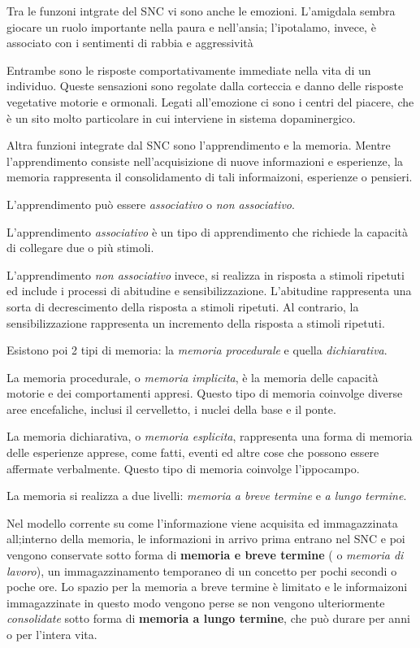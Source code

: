 \documentclass[]{article}
\begin{document}
Tra le funzoni intgrate del SNC vi sono anche le emozioni. L'amigdala
sembra giocare un ruolo importante nella paura e nell'ansia;
l'ipotalamo, invece, è associato con i sentimenti di rabbia e
aggressività

Entrambe sono le risposte comportativamente immediate nella vita di un
individuo. Queste sensazioni sono regolate dalla corteccia e danno delle
risposte vegetative motorie e ormonali. Legati all'emozione ci sono i
centri del piacere, che è un sito molto particolare in cui interviene in
sistema dopaminergico.

Altra funzioni integrate dal SNC sono l'apprendimento e la memoria.
Mentre l'apprendimento consiste nell'acquisizione di nuove informazioni
e esperienze, la memoria rappresenta il consolidamento di tali
informaizoni, esperienze o pensieri.

L'apprendimento può essere \emph{associativo} o \emph{non associativo}.

L'apprendimento \emph{associativo} è un tipo di apprendimento che
richiede la capacità di collegare due o più stimoli.

L'apprendimento \emph{non associativo} invece, si realizza in risposta a
stimoli ripetuti ed include i processi di abitudine e sensibilizzazione.
L'abitudine rappresenta una sorta di decrescimento della risposta a
stimoli ripetuti. Al contrario, la sensibilizzazione rappresenta un
incremento della risposta a stimoli ripetuti.

Esistono poi 2 tipi di memoria: la \emph{memoria procedurale} e quella
\emph{dichiarativa}.

La memoria procedurale, o \emph{memoria implicita}, è la memoria delle
capacità motorie e dei comportamenti appresi. Questo tipo di memoria
coinvolge diverse aree encefaliche, inclusi il cervelletto, i nuclei
della base e il ponte.

La memoria dichiarativa, o \emph{memoria esplicita}, rappresenta una
forma di memoria delle esperienze apprese, come fatti, eventi ed altre
cose che possono essere affermate verbalmente. Questo tipo di memoria
coinvolge l'ippocampo.

La memoria si realizza a due livelli: \emph{memoria a breve termine} e
\emph{a lungo termine}.

Nel modello corrente su come l'informazione viene acquisita ed
immagazzinata all;interno della memoria, le informazioni in arrivo prima
entrano nel SNC e poi vengono conservate sotto forma di \textbf{memoria
e breve termine} ( o \emph{memoria di lavoro}), un immagazzinamento
temporaneo di un concetto per pochi secondi o poche ore. Lo spazio per
la memoria a breve termine è limitato e le informaizoni immagazzinate in
questo modo vengono perse se non vengono ulteriormente
\emph{consolidate} sotto forma di \textbf{memoria a lungo termine}, che
può durare per anni o per l'intera vita.
\end{document}
